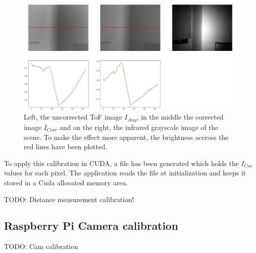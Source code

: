 \begin{figure}[H]
    \centering
    \includegraphics[width=1.0\textwidth]{images/flattened_tof_example.png}
    \caption{Left, the uncorrected ToF image $I_{Any}$, in the middle the corrected image $I_{Corr}$ and on the right, the infrared grayscale image of the scene. To make the effect more apparent, the brightness accross the red lines have been plotted.}
    \label{im:ToFCorrected}
\end{figure}
To apply this calibration in CUDA, a file has been generated which holds the $I_{Cos}$ values for each pixel. The application reads the file at initialization and keeps it stored in a Cuda allocated memory area. 


TODO: Distance measurement calibration!
\subsection{Raspberry Pi Camera calibration}
\label{sec:RBPiCalibration}
TODO: Cam calibration
